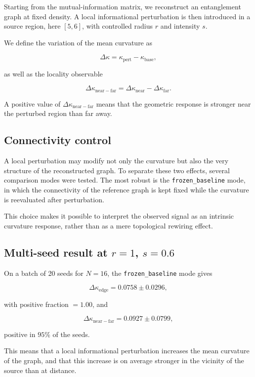 \documentclass[11pt]{article}
\begin{document}
Starting from the mutual-information matrix, we reconstruct an entanglement graph at fixed density. A local informational perturbation is then introduced in a source region, here $[5,6]$, with controlled radius $r$ and intensity $s$.

We define the variation of the mean curvature as

\[
\Delta \kappa = \kappa_{\mathrm{pert}}-\kappa_{\mathrm{base}},
\]

as well as the locality observable

\[
\Delta \kappa_{\mathrm{near-far}}
=
\Delta \kappa_{\mathrm{near}}
-
\Delta \kappa_{\mathrm{far}}.
\]

A positive value of $\Delta \kappa_{\mathrm{near-far}}$ means that the geometric response is stronger near the perturbed region than far away.

\subsection{Connectivity control}

A local perturbation may modify not only the curvature but also the very structure of the reconstructed graph. To separate these two effects, several comparison modes were tested. The most robust is the \texttt{frozen\_baseline} mode, in which the connectivity of the reference graph is kept fixed while the curvature is reevaluated after perturbation.

This choice makes it possible to interpret the observed signal as an intrinsic curvature response, rather than as a mere topological rewiring effect.

\subsection{Multi-seed result at $r=1$, $s=0.6$}

On a batch of 20 seeds for $N=16$, the \texttt{frozen\_baseline} mode gives

\[
\Delta \kappa_{\mathrm{edge}} = 0.0758 \pm 0.0296,
\]

with positive fraction $=1.00$, and

\[
\Delta \kappa_{\mathrm{near-far}} = 0.0927 \pm 0.0799,
\]

positive in $95\%$ of the seeds.

This means that a local informational perturbation increases the mean curvature of the graph, and that this increase is on average stronger in the vicinity of the source than at distance.
\end{document}
